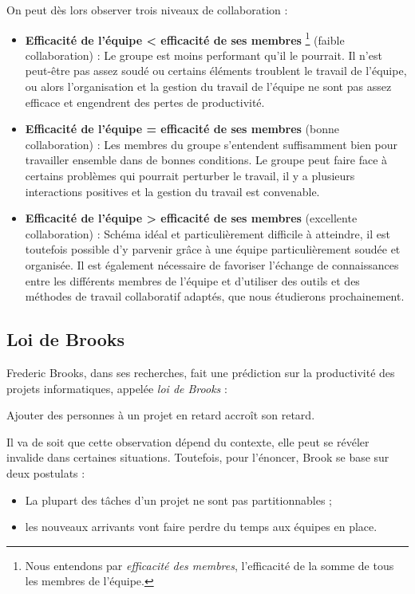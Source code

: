On peut dès lors observer trois niveaux de collaboration :\\

\begin{itemize}

\item \textbf{Efficacité de l'équipe \textless \: efficacité de ses membres} \footnote{Nous entendons par \textit{efficacité des membres}, l'efficacité de la somme de tous les membres de l'équipe.} (faible collaboration) :
Le groupe est moins performant qu'il le pourrait. Il n'est peut-être pas assez soudé ou certains éléments troublent le travail de l'équipe, ou alors l'organisation et la gestion du travail de l'équipe ne sont pas assez efficace et engendrent des pertes de productivité.\\

\item \textbf{Efficacité de l'équipe = efficacité de ses membres} (bonne collaboration) :
Les membres du groupe s'entendent suffisamment bien pour travailler ensemble dans de bonnes conditions. Le groupe peut faire face à certains problèmes qui pourrait perturber le travail, il y a plusieurs interactions positives et la gestion du travail est convenable.\\

\item \textbf{Efficacité de l'équipe \textgreater \: efficacité de ses membres} (excellente collaboration) :
Schéma idéal et particulièrement difficile à atteindre, il est toutefois possible d'y parvenir grâce à une équipe particulièrement soudée et organisée. Il est également nécessaire de favoriser l'échange de connaissances entre les différents membres de l'équipe et d'utiliser des outils et des méthodes de travail collaboratif adaptés, que nous étudierons prochainement.

\end{itemize}

\subsection{Loi de Brooks}
Frederic Brooks, dans ses recherches, fait une prédiction sur la productivité des projets informatiques, appelée \textit{loi de Brooks} :

\begin{Quote}
Ajouter des personnes à un projet en retard accroît son retard.
\end{Quote}

Il va de soit que cette observation dépend du contexte, elle peut se révéler invalide dans certaines situations. Toutefois, pour l'énoncer, Brook se base sur deux postulats :
\begin{itemize}
\item La plupart des tâches d'un projet ne sont pas partitionnables ;
\item les nouveaux arrivants vont faire perdre du temps aux équipes en place.
\end{itemize}


